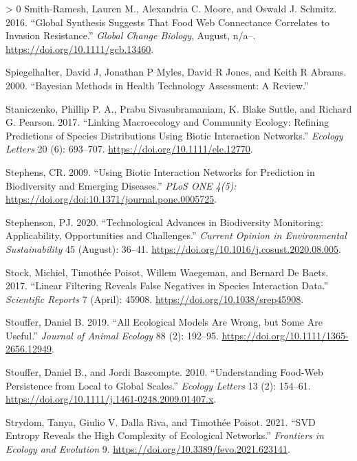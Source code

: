 \documentclass[11pt]{article}
\newlength{\cslhangindent}
\newenvironment{CSLReferences}[3] %
 {%
  \setlength{\parindent}{0pt}
  \ifodd #1 \everypar{\setlength{\hangindent}{\cslhangindent}}\ignorespaces\fi
  \ifnum #2 > 0
  \setlength{\parskip}{#2\baselineskip}
  \fi
 }%
 {}
\begin{document}
\begin{CSLReferences}{1}{0}
\leavevmode\hypertarget{ref-Smith-Ramesh2016GloSyn}{}%
Smith-Ramesh, Lauren M., Alexandria C. Moore, and Oswald J. Schmitz.
2016. {``Global Synthesis Suggests That Food Web Connectance Correlates
to Invasion Resistance.''} \emph{Global Change Biology}, August, n/a--.
\url{https://doi.org/10.1111/gcb.13460}.

\leavevmode\hypertarget{ref-Spiegelhalter2000BayMet}{}%
Spiegelhalter, David J, Jonathan P Myles, David R Jones, and Keith R
Abrams. 2000. {``Bayesian Methods in Health Technology Assessment: A
Review.''}

\leavevmode\hypertarget{ref-Staniczenko2017LinMac}{}%
Staniczenko, Phillip P. A., Prabu Sivasubramaniam, K. Blake Suttle, and
Richard G. Pearson. 2017. {``Linking Macroecology and Community Ecology:
Refining Predictions of Species Distributions Using Biotic Interaction
Networks.''} \emph{Ecology Letters} 20 (6): 693--707.
\url{https://doi.org/10.1111/ele.12770}.

\leavevmode\hypertarget{ref-Stephens2009UsiBio}{}%
Stephens, CR. 2009. {``Using Biotic Interaction Networks for Prediction
in Biodiversity and Emerging Diseases.''} \emph{PLoS ONE 4(5):}
\url{https://doi.org/doi:10.1371/journal.pone.0005725}.

\leavevmode\hypertarget{ref-Stephenson2020TecAdv}{}%
Stephenson, PJ. 2020. {``Technological Advances in Biodiversity
Monitoring: Applicability, Opportunities and Challenges.''}
\emph{Current Opinion in Environmental Sustainability} 45 (August):
36--41. \url{https://doi.org/10.1016/j.cosust.2020.08.005}.

\leavevmode\hypertarget{ref-Stock2017LinFil}{}%
Stock, Michiel, Timothée Poisot, Willem Waegeman, and Bernard De Baets.
2017. {``Linear Filtering Reveals False Negatives in Species Interaction
Data.''} \emph{Scientific Reports} 7 (April): 45908.
\url{https://doi.org/10.1038/srep45908}.

\leavevmode\hypertarget{ref-Stouffer2019AllEco}{}%
Stouffer, Daniel B. 2019. {``All Ecological Models Are Wrong, but Some
Are Useful.''} \emph{Journal of Animal Ecology} 88 (2): 192--95.
\url{https://doi.org/10.1111/1365-2656.12949}.

\leavevmode\hypertarget{ref-Stouffer2010UndFoo}{}%
Stouffer, Daniel B., and Jordi Bascompte. 2010. {``Understanding
Food-Web Persistence from Local to Global Scales.''} \emph{Ecology
Letters} 13 (2): 154--61.
\url{https://doi.org/10.1111/j.1461-0248.2009.01407.x}.

\leavevmode\hypertarget{ref-Strydom2021SvdEnt}{}%
Strydom, Tanya, Giulio V. Dalla Riva, and Timothée Poisot. 2021. {``SVD
Entropy Reveals the High Complexity of Ecological Networks.''}
\emph{Frontiers in Ecology and Evolution} 9.
\url{https://doi.org/10.3389/fevo.2021.623141}.


\end{CSLReferences}
\end{document}
